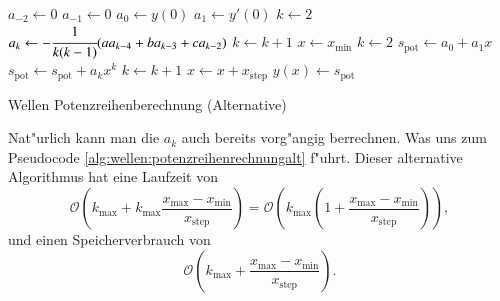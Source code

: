 \begin{algorithm}
	\begin{algorithmic}[1]
		\State $a_{-2} \gets 0$
		\State $a_{-1} \gets 0$
		\State $a_0 \gets y(0)$
		\State $a_1 \gets y'(0)$
		\State $k \gets 2$
			\State $a_k \gets -\cfrac{1}{k(k-1)} (aa_{k-4}+ba_{k-3}+ca_{k-2})$
			\State $k \gets k + 1$
		\EndFor
		\State $x \gets x_{\text{min}}$
			\State $k \gets 2$
			\State $s_{\text{pot}} \gets a_0 + a_1x$
				\State $s_{\text{pot}} \gets s_{\text{pot}} + a_k x^k$
				\State $k \gets k + 1$
			\EndFor
			\State $x \gets x + x_{\text{step}}$
			\State $y(x) \gets s_{\text{pot}}$
		\EndFor
	\end{algorithmic}
	\caption{Wellen Potenzreihenberechnung (Alternative)}
	\label{alg:wellen:potenzreihenrechnungalt}
\end{algorithm}

Nat"urlich kann man die $a_k$ auch bereits vorg"angig berrechnen. Was uns zum 
Pseudocode \ref{alg:wellen:potenzreihenrechnungalt} f"uhrt. Dieser 
alternative Algorithmus hat eine Laufzeit von
\begin{equation*}
	\mathcal{O}
	\left(k_{\text{max}} + 
		k_{\text{max}}\frac{x_{\text{max}}-x_{\text{min}}}{x_{\text{step}}}
	\right)
	=
	\mathcal{O}
	\left(
		k_{\text{max}}
		\left(
			1+\frac{x_{\text{max}}-x_{\text{min}}}{x_{\text{step}}}
		\right)
	\right),
\end{equation*}
und einen Speicherverbrauch von
\begin{equation*}
	\mathcal{O}
	\left(
		k_{\text{max}} + 
		\frac{x_{\text{max}}-x_{\text{min}}}{x_{\text{step}}}
	\right).
\end{equation*}